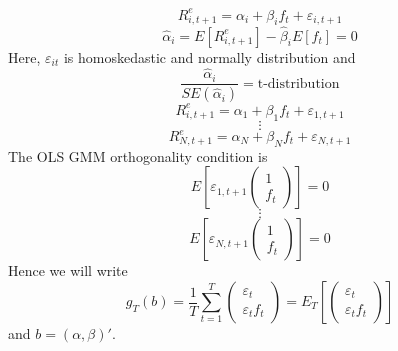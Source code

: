 \documentclass[11pt, a4paper, oneside]{article}
\theoremstyle{definition}
\theoremstyle{proposition}
\theoremstyle{corollary}
\theoremstyle{lemma}
\theoremstyle{theorem}
\begin{document}
$$R_{i, t+1}^e = \alpha_i  +\beta_i f_t + \varepsilon_{i, t+1}$$
$$\hat{\alpha}_i = E[R_{i, t+1}^e] - \hat{\beta}_i E[f_t] = 0$$
Here, $\varepsilon_{it}$ is homoskedastic and normally distribution and
$$\frac{\hat{\alpha}_i}{SE(\hat{\alpha}_i)}= \text{t-distribution}$$
$$R_{i, t+1}^e = \alpha_1 + \beta_1f_t+\varepsilon_{1, t+1}$$
$$\vdots$$
$$R_{N, t+1}^e = \alpha_N + \beta_N f_t + \varepsilon_{N, t+1}$$
The OLS GMM orthogonality condition is 
$$E\left[\varepsilon_{1, t+1}\begin{pmatrix} 1 \\ f_t\end{pmatrix}\right] = 0$$
$$\vdots$$
$$E\left[\varepsilon_{N, t+1}\begin{pmatrix} 1 \\ f_t\end{pmatrix}\right] = 0$$
Hence we will write 
$$g_T(b) = \frac{1}{T}\sum_{t=1}^T\begin{pmatrix} \varepsilon_t \\\varepsilon_t f_t\end{pmatrix} = E_T\left[\begin{pmatrix} \varepsilon_t \\ \varepsilon_tf_t\end{pmatrix}\right]$$
and $b = (\alpha, \beta)'$. 
\end{document}
